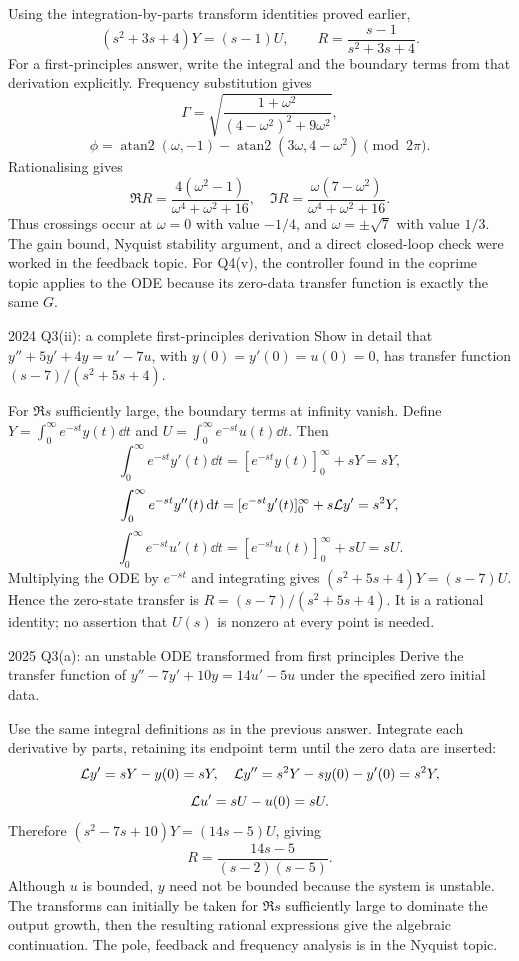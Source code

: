 \begin{answer}
Using the integration-by-parts transform identities proved earlier,
\[(s^2+3s+4)Y=(s-1)U,\qquad R=\frac{s-1}{s^2+3s+4}.\]
For a first-principles answer, write the integral and the boundary terms from that derivation explicitly. Frequency substitution gives
\[\Gamma=\sqrt{\frac{1+\omega^2}{(4-\omega^2)^2+9\omega^2}},\]
\[\phi=\operatorname{atan2}(\omega,-1)-\operatorname{atan2}(3\omega,4-\omega^2)\pmod{2\pi}.\]
Rationalising gives
\[\Re R=\frac{4(\omega^2-1)}{\omega^4+\omega^2+16},\quad\Im R=\frac{\omega(7-\omega^2)}{\omega^4+\omega^2+16}.\]
Thus crossings occur at $\omega=0$ with value $-1/4$, and $\omega=\pm\sqrt7$ with value $1/3$. The gain bound, Nyquist stability argument, and a direct closed-loop check were worked in the feedback topic. For Q4(v), the controller found in the coprime topic applies to the ODE because its zero-data transfer function is exactly the same $G$.
\end{answer}
\begin{question}{2024 Q3(ii): a complete first-principles derivation}
Show in detail that $y''+5y'+4y=u'-7u$, with $y(0)=y'(0)=u(0)=0$, has transfer function $(s-7)/(s^2+5s+4)$.
\end{question}
\begin{answer}
For $\Re s$ sufficiently large, the boundary terms at infinity vanish. Define $Y=\int_0^\infty e^{-st}y(t)\dd t$ and $U=\int_0^\infty e^{-st}u(t)\dd t$. Then
\[\int_0^\infty e^{-st}y'(t)\dd t=[e^{-st}y(t)]_0^\infty+sY=sY,\]
\[\int_0^\infty e^{-st}y''(t)\,\mathrm d t=[e^{-st}y'(t)]_0^\infty+s\mathcal L y'=s^2Y,\]
\[\int_0^\infty e^{-st}u'(t)\dd t=[e^{-st}u(t)]_0^\infty+sU=sU.\]
Multiplying the ODE by $e^{-st}$ and integrating gives $(s^2+5s+4)Y=(s-7)U$. Hence the zero-state transfer is $R=(s-7)/(s^2+5s+4)$. It is a rational identity; no assertion that $U(s)$ is nonzero at every point is needed.
\end{answer}
\begin{question}{2025 Q3(a): an unstable ODE transformed from first principles}
Derive the transfer function of $y''-7y'+10y=14u'-5u$ under the specified zero initial data.
\end{question}
\begin{answer}
Use the same integral definitions as in the previous answer. Integrate each derivative by parts, retaining its endpoint term until the zero data are inserted:
\[\mathcal L y'=sY-y(0)=sY,\quad\mathcal L y''=s^2Y-sy(0)-y'(0)=s^2Y,\]
\[\mathcal L u'=sU-u(0)=sU.\]
Therefore $(s^2-7s+10)Y=(14s-5)U$, giving
\[R=\frac{14s-5}{(s-2)(s-5)}.\]
Although $u$ is bounded, $y$ need not be bounded because the system is unstable. The transforms can initially be taken for $\Re s$ sufficiently large to dominate the output growth, then the resulting rational expressions give the algebraic continuation. The pole, feedback and frequency analysis is in the Nyquist topic.
\end{answer}
